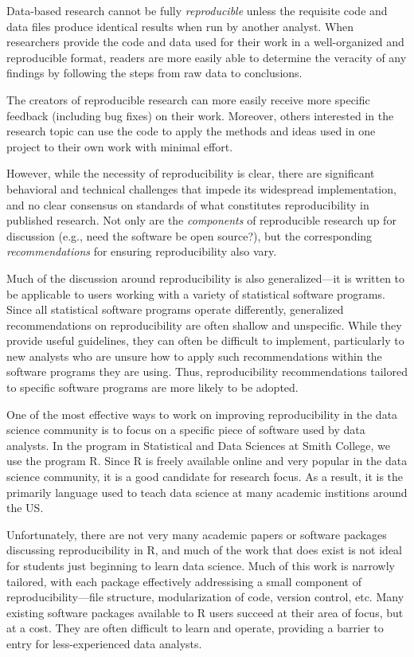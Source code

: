 \documentclass[12pt]{article}
\begin{document}
Data-based research cannot be fully \emph{reproducible} unless the
requisite code and data files produce identical results when run by
another analyst. When researchers provide the code and data used for
their work in a well-organized and reproducible format, readers are more
easily able to determine the veracity of any findings by following the
steps from raw data to conclusions.

The creators of reproducible research can more easily receive more
specific feedback (including bug fixes) on their work. Moreover, others
interested in the research topic can use the code to apply the methods
and ideas used in one project to their own work with minimal effort.

However, while the necessity of reproducibility is clear, there are
significant behavioral and technical challenges that impede its
widespread implementation, and no clear consensus on standards of what
constitutes reproducibility in published research. Not only are the
\emph{components} of reproducible research up for discussion (e.g., need
the software be open source?), but the corresponding
\emph{recommendations} for ensuring reproducibility also vary.

Much of the discussion around reproducibility is also generalized---it
is written to be applicable to users working with a variety of
statistical software programs. Since all statistical software programs
operate differently, generalized recommendations on reproducibility are
often shallow and unspecific. While they provide useful guidelines, they
can often be difficult to implement, particularly to new analysts who
are unsure how to apply such recommendations within the software
programs they are using. Thus, reproducibility recommendations tailored
to specific software programs are more likely to be adopted.

One of the most effective ways to work on improving reproducibility in
the data science community is to focus on a specific piece of software
used by data analysts. In the program in Statistical and Data Sciences
at Smith College, we use the program R. Since R is freely available
online and very popular in the data science community, it is a good
candidate for research focus. As a result, it is the primarily language
used to teach data science at many academic institions around the US.

Unfortunately, there are not very many academic papers or software
packages discussing reproducibility in R, and much of the work that does
exist is not ideal for students just beginning to learn data science.
Much of this work is narrowly tailored, with each package effectively
addressising a small component of reproducibility---file structure,
modularization of code, version control, etc. Many existing software
packages available to R users succeed at their area of focus, but at a
cost. They are often difficult to learn and operate, providing a barrier
to entry for less-experienced data analysts.
\end{document}
